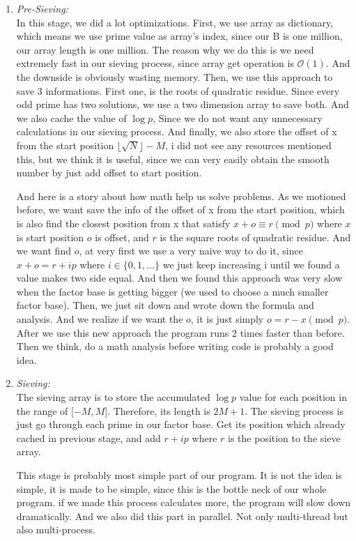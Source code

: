 \documentclass[12pt]{article} %
\newcommand{\itemgap}[1][2]{\vspace{#1mm}}
\begin{document}
\begin{enumerate}
\item \textit{Pre-Sieving:} \itemgap
\\ In this stage, we did a lot optimizations. First, we use array as dictionary, which means we use prime value as array's index, since our B is one million, our array length is one million. The reason why we do this is we need extremely fast in our sieving process, since array get operation is $\mathcal{O}(1)$. And the downside is obviously wasting memory. Then, we use this approach to save 3 informations. First one, is the roots of quadratic residue. Since every odd prime has two solutions, we use a two dimension array to save both. And we also cache the value of $\log p$, Since we do not want any unnecessary calculations in our sieving process. And finally, we also store the offset of x from the start position $\lfloor \sqrt{N} \rfloor - M$, i did not see any resources mentioned this, but we think it is useful, since we can very easily obtain the smooth number by just add offset to start position. 

And here is a story about how math help us solve problems. As we motioned before, we want save the info of the offset of x from the start position, which is also find the closest position from x that satisfy $x+o \equiv r \pmod{p}$ where $x$ is start position $o$ is offset, and $r$ is the square roots of quadratic residue. And we want find $o$, at very first we use a very naive way to do it, since $x+o=r+ip$ where $i \in \{0,1,\dots\}$ we just keep increasing i until we found a value makes two side equal. And then we found this approach was very slow when the factor base is getting bigger (we used to choose a much smaller factor base). Then, we just sit down and wrote down the formula and analysis. And we realize if we want the $o$, it is just simply $o = r-x \pmod{p}$. After we use this new approach the program runs 2 times faster than before. Then we think, do a math analysis before writing code is probably a good idea.

\item \textit{Sieving:} \itemgap
\\ The sieving array is to store the accumulated $\log{p}$ value for each position in the range of [$-M, M$]. Therefore, its length is $2M+1$. The sieving process is just go through each prime in our factor base. Get its position which already cached in previous stage, and add $r+ip$ where $r$ is the position to the sieve array.

This stage is probably most simple part of our program. It is not the idea is simple, it is made to be simple, since this is the bottle neck of our whole program. if we made this process calculates more, the program will slow down dramatically. And we also did this part in parallel. Not only multi-thread but also multi-process. 


\end{enumerate}
\end{document}
